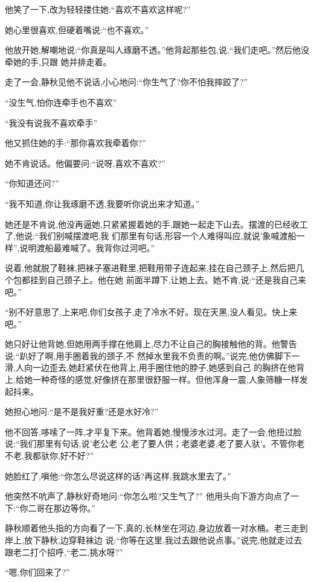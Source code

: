 ﻿\documentclass[12pt]{article}
\begin{document}
他笑了一下,改为轻轻搂住她:``喜欢不喜欢这样呢?''

她心里很喜欢,但硬着嘴说:``也不喜欢。''

他放开她,解嘲地说:``你\myrule 真是叫人琢磨不透。''他背起那些包,说,``我们走吧。''然后他没牵她的手,只跟
她并排走着。

走了一会,静秋见他不说话,小心地问:``你\myrule 生气了?你不怕我\myrule 摔跤了?''

``没生气,怕你连牵手也不喜欢\myrule ''

``我没有说我\myrule 不喜欢\myrule 牵手\myrule ''

他又抓住她的手:``那你\myrule 喜欢我牵着你?''

她不肯说话。他偏要问:``说呀,喜欢不喜欢?''

``你知道\myrule 还问?''

``我不知道,你让我琢磨不透,我要听你说出来才知道。''

她还是不肯说,他没再逼她,只紧紧握着她的手,跟她一起走下山去。摆渡的已经收工了,他说:``我们别喊摆渡吧,我
们那里有句话,形容一个人难得叫应,就说'象喊渡船一样'',说明渡船最难喊了。我背你过河吧。''

说着,他就脱了鞋袜,把袜子塞进鞋里,把鞋用带子连起来,挂在自己颈子上,然后把几个包都挂到自己颈子上。他在她
前面半蹲下,让她上去。她不肯,说:``还是我自己来吧。''

``别不好意思了,上来吧,你们女孩子,走了冷水不好。现在天黑,没人看见。快上来吧。''

她只好让他背她,但她用两手撑在他肩上,尽力不让自己的胸接触他的背。他警告说:``趴好了啊,用手圈着我的颈子,不
然掉水里我不负责的啊。''说完,他仿佛脚下一滑,人向一边歪去,她赶紧伏在他背上,用手圈住他的脖子,她感到自己
的胸挤在他背上,给她一种奇怪的感觉,好像挤在那里很舒服一样。但他浑身一震,人象筛糠一样发起抖来。

她担心地问:``是不是我好重?还是水好冷?''

他不回答,哆嗦了一阵,才平复下来。他背着她,慢慢涉水过河。走了一会,他扭过脸说:``我们那里有句话,说'老公老
公,老了要人供；老婆老婆,老了要人驮'。不管你老不老,我都驮你,好不好?''

她脸红了,嗔他:``你怎么尽说这样的话?再这样,我\myrule 跳水里去了。''

他突然不吭声了,静秋好奇地问:``你怎么啦?又生气了?'' 他用头向下游方向点了一下:``你二哥在那边等你。''

静秋顺着他头指的方向看了一下,真的,长林坐在河边,身边放着一对水桶。老三走到岸上,放下静秋,边穿鞋袜边
说:``你等在这里,我过去跟他说点事。''说完,他就走过去跟老二打个招呼,``老二,挑水呀?''

``嗯,你们回来了?''
\end{document}
